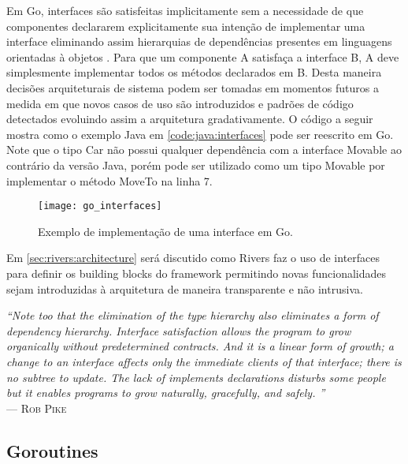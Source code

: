 Em Go, interfaces são satisfeitas implicitamente sem a necessidade de que componentes declararem explicitamente sua intenção de implementar uma interface eliminando assim hierarquias de dependências presentes em linguagens orientadas à objetos \cite{book:learn_oop}. Para que um componente A satisfaça a interface B, A deve simplesmente implementar todos os métodos declarados em B. Desta maneira decisões arquiteturais de sistema podem ser tomadas em momentos futuros a medida em que novos casos de uso são introduzidos e padrões de código detectados evoluindo assim a arquitetura gradativamente. O código a seguir mostra como o exemplo Java em \ref{code:java:interfaces} pode ser reescrito em Go. Note que o tipo Car não possui qualquer dependência com a interface Movable ao contrário da versão Java, porém pode ser utilizado como um tipo Movable por implementar o método MoveTo na linha 7.

\begin{figure}[H]
  \texttt{[image: go\_interfaces]}
  \centering
  \caption{Exemplo de implementação de uma interface em Go.}
  \label{code:go:interfaces}
\end{figure}

Em \ref{sec:rivers:architecture} será discutido como Rivers faz o uso de interfaces para definir os building blocks do framework permitindo novas funcionalidades sejam introduzidas à arquitetura de maneira transparente e não intrusiva.

\begin{flushright}
\mbox{}\vfill
{\sffamily\itshape
``Note too that the elimination of the type hierarchy also eliminates a form of dependency hierarchy. Interface satisfaction allows the program to grow organically without predetermined contracts. And it is a linear form of growth; a change to an interface affects only the immediate clients of that interface; there is no subtree to update. The lack of implements declarations disturbs some people but it enables programs to grow naturally, gracefully, and safely.
''\\}
--- \textsc{Rob Pike}
\end{flushright}

\subsection{Goroutines}
\label{subsec:goroutines}

